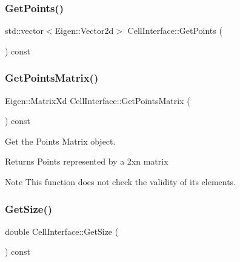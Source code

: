 \mbox{\label{classCellInterface_a011b22b778a1cac212becf05c204c48e}} 
\subsubsection{\texorpdfstring{Get\+Points()}{GetPoints()}}
{\footnotesize\ttfamily std\+::vector$<$Eigen\+::\+Vector2d$>$ Cell\+Interface\+::\+Get\+Points (\begin{DoxyParamCaption}{ }\end{DoxyParamCaption}) const\hspace{0.3cm}{\ttfamily [inline]}}

\mbox{\label{classCellInterface_abf249487edef6811dda54d7b3ee9d710}} 
\subsubsection{\texorpdfstring{Get\+Points\+Matrix()}{GetPointsMatrix()}}
{\footnotesize\ttfamily Eigen\+::\+Matrix\+Xd Cell\+Interface\+::\+Get\+Points\+Matrix (\begin{DoxyParamCaption}{ }\end{DoxyParamCaption}) const\hspace{0.3cm}{\ttfamily [inline]}}



Get the Points Matrix object. 

\begin{DoxyReturn}{Returns}
Points represented by a {\ttfamily 2xn} matrix 
\end{DoxyReturn}
\begin{DoxyNote}{Note}
This function does not check the validity of its elements. 
\end{DoxyNote}
\mbox{\label{classCellInterface_a21bb156a72ad4502808efaab900094d3}} 
\subsubsection{\texorpdfstring{Get\+Size()}{GetSize()}}
{\footnotesize\ttfamily double Cell\+Interface\+::\+Get\+Size (\begin{DoxyParamCaption}{ }\end{DoxyParamCaption}) const\hspace{0.3cm}{\ttfamily [inline]}}



